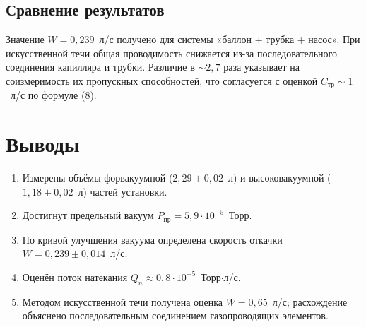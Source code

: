 \documentclass[12pt,a4paper]{article}
\begin{document}
\subsection{Сравнение результатов}
Значение $W = 0,239$\ л/с получено для системы «баллон + трубка + насос». При искусственной течи общая проводимость снижается из-за последовательного соединения капилляра и трубки. Различие в $\sim 2,7$ раза указывает на соизмеримость их пропускных способностей, что согласуется с оценкой $C_{\text{тр}} \sim 1$\ л/с по формуле (8).

\section{Выводы}
\begin{enumerate}
    \item Измерены объёмы форвакуумной ($2,29 \pm 0,02$\ л) и высоковакуумной ($1,18 \pm 0,02$\ л) частей установки.
    \item Достигнут предельный вакуум $P_{\text{пр}} = 5,9\cdot10^{-5}$\ Торр.
    \item По кривой улучшения вакуума определена скорость откачки $W = 0,239 \pm 0,014$\ л/с.
    \item Оценён поток натекания $Q_n \approx 0,8\cdot10^{-5}$\ Торр$\cdot$л/с.
    \item Методом искусственной течи получена оценка $W = 0,65$\ л/с; расхождение объяснено последовательным соединением газопроводящих элементов.
\end{enumerate}
\end{document}
